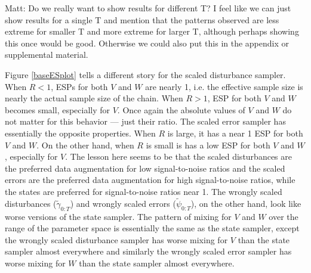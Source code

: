 \documentclass{article}
\newcommand{\matt}[1]{{\color{red} Matt: #1}}
\begin{document}
\matt{Do we really want to show results for different T? I feel like we can just show results for a single T and mention that the patterns observed are less extreme for smaller T and more extreme for larger T, although perhaps showing this once would be good. Otherwise we could also put this in the appendix or supplemental material.}







Figure \ref{baseESplot} tells a different story for the scaled disturbance sampler. When $R<1$, ESPs for both $V$ and $W$ are nearly 1, i.e. the effective sample size is nearly the actual sample size of the chain. When $R>1$, ESP for both $V$ and $W$ becomes small, especially for $V$. Once again the absolute values of $V$ and $W$ do not matter for this behavior --- just their ratio. The scaled error sampler has essentially the opposite properties. When $R$ is large, it has a near 1 ESP for both $V$ and $W$. On the other hand, when $R$ is small is has a low ESP for both $V$ and $W$, especially for $V$. The lesson here seems to be that the scaled disturbances are the preferred data augmentation for low signal-to-noise ratios and the scaled errors  are the preferred data augmentation for high signal-to-noise ratios, while the states are preferred for signal-to-noise ratios near 1. The wrongly scaled disturbances ($\tilde{\gamma}_{0:T}$) and wrongly scaled errors ($\tilde{\psi}_{0:T}$), on the other hand, look like worse versions of the state sampler. The pattern of mixing for $V$ and $W$ over the range of the parameter space is essentially the same as the state sampler, except the wrongly scaled disturbance sampler has worse mixing for $V$ than the state sampler almost everywhere and similarly the wrongly scaled error sampler has worse mixing for $W$ than the state sampler almost everywhere.
\end{document}
